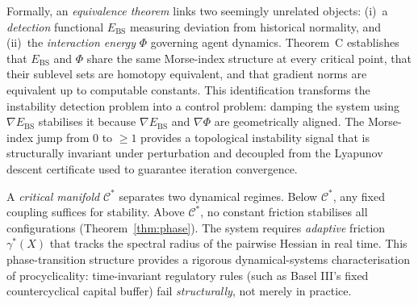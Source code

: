 \documentclass[final]{siamltex}
\providecommand{\grad}{\nabla}
\newcommand{\Ebs}{E_{\mathrm{BS}}}
\newcommand{\Cman}{\mathcal{C}^*}
\begin{document}
Formally, an \emph{equivalence theorem} links two seemingly
unrelated objects: (i)~a \emph{detection} functional $\Ebs$
measuring deviation from historical normality, and (ii)~the
\emph{interaction energy} $\Phi$ governing agent dynamics.
Theorem~C establishes that $\Ebs$ and $\Phi$ share the same
Morse-index structure at every critical point, that their sublevel
sets are homotopy equivalent, and that gradient norms are equivalent
up to computable constants.  This identification transforms
the instability detection problem into a control problem: damping
the system using $\grad\Ebs$ stabilises it because $\grad\Ebs$ and
$\grad\Phi$ are geometrically aligned.  The Morse-index jump from
$0$ to $\ge 1$ provides a topological instability signal that is
structurally invariant under perturbation and decoupled from the
Lyapunov descent certificate used to guarantee iteration
convergence.

A \emph{critical manifold} $\Cman$ separates two dynamical
regimes. Below $\Cman$, any fixed coupling suffices for stability.
Above $\Cman$, no constant friction stabilises all configurations
(Theorem~\ref{thm:phase}). The system requires \emph{adaptive}
friction $\gamma^*(X)$ that tracks the spectral radius of the
pairwise Hessian in real time. This phase-transition structure
provides a rigorous dynamical-systems characterisation of
procyclicality: time-invariant regulatory rules (such as Basel
III's fixed countercyclical capital buffer) fail
\emph{structurally}, not merely in practice.
\end{document}
